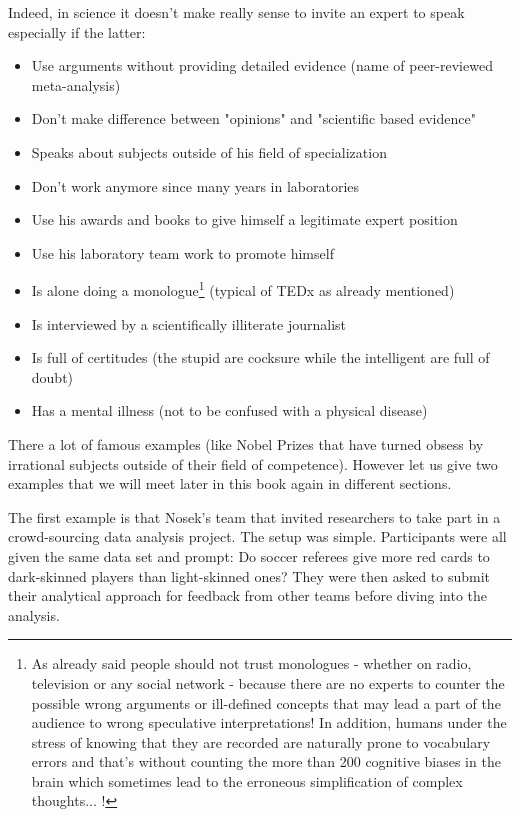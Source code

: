 	Indeed, in science it doesn't make really sense to invite an expert to speak especially if the latter:
	\begin{itemize}
		\item Use arguments without providing detailed evidence (name of peer-reviewed meta-analysis)
		
		\item Don't make difference between "opinions" and "scientific based evidence"
		
		\item Speaks about subjects outside of his field of specialization
		
		\item Don't work anymore since many years in laboratories
		
		\item Use his awards and books to give himself a legitimate expert position
		
		\item Use his laboratory team work to promote himself
		
		\item Is alone doing a monologue\footnote{As already said people should not trust monologues - whether on radio, television or any social network - because there are no experts to counter the possible wrong arguments or ill-defined concepts that may lead a part of the audience to wrong speculative interpretations! In addition, humans under the stress of knowing that they are recorded are naturally prone to vocabulary errors and that's without counting the more than 200 cognitive biases in the brain which sometimes lead to the erroneous simplification of complex thoughts... !} (typical of TEDx as already mentioned)
		
		\item Is interviewed by a scientifically illiterate journalist
		
		\item Is full of certitudes (the stupid are cocksure while the intelligent are full of doubt)
		
		\item Has a mental illness (not to be confused with a physical disease)
	\end{itemize}
	There a lot of famous examples (like Nobel Prizes that have turned obsess by irrational subjects outside of their field of competence). However let us give two examples that we will meet later in this book again in different sections.
	
	 The first example is that Nosek's team that invited researchers to take part in a crowd-sourcing data analysis project. The setup was simple. Participants were all given the same data set and prompt: Do soccer referees give more red cards to dark-skinned players than light-skinned ones? They were then asked to submit their analytical approach for feedback from other teams before diving into the analysis.

